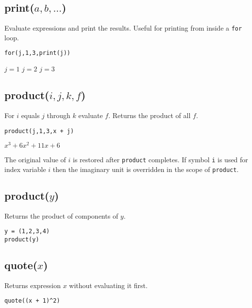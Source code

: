 \subsection*{print($a,b,\ldots$)}

Evaluate expressions and print the results.
Useful for printing from inside a {\tt for} loop.

{\color{blue}
\begin{verbatim}
for(j,1,3,print(j))
\end{verbatim}
}

\noindent
$j=1$\newline
$j=2$\newline
$j=3$

\subsection*{product($i,j,k,f$)}

For $i$ equals $j$ through $k$ evaluate $f$.
Returns the product of all $f$.

{\color{blue}
\begin{verbatim}
product(j,1,3,x + j)
\end{verbatim}
}

\noindent
$\displaystyle x^3+6x^2+11x+6$

\bigskip
\noindent
The original value of $i$ is restored after {\tt product} completes.
If symbol {\tt i} is used for index variable $i$
then the imaginary unit is overridden in the scope of {\tt product}.

\subsection*{product($y$)}

Returns the product of components of $y$.

{\color{blue}
\begin{verbatim}
y = (1,2,3,4)
product(y)
\end{verbatim}
}


\subsection*{quote($x$)}

Returns expression $x$ without evaluating it first.

{\color{blue}
\begin{verbatim}
quote((x + 1)^2)
\end{verbatim}
}

